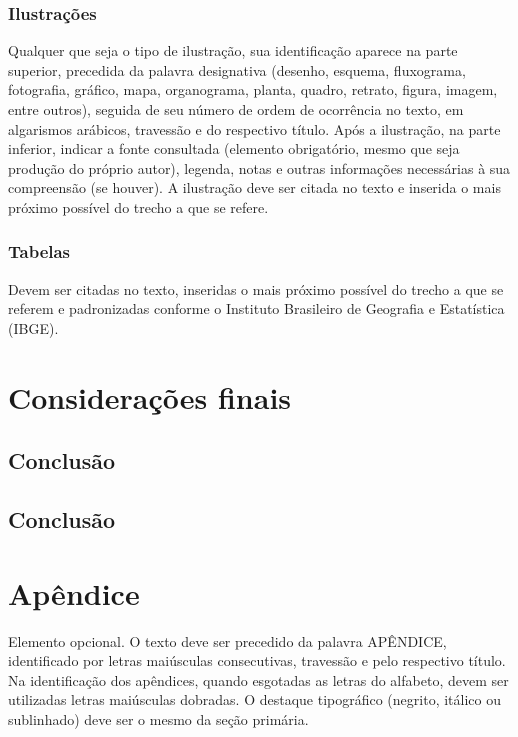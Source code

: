 \documentclass{Arquivos/TrabalhoAcademico}
\begin{document}
\subsection{Ilustrações}
Qualquer que seja o tipo de ilustração, sua identificação aparece na parte superior, precedida da
palavra designativa (desenho, esquema, fluxograma, fotografia, gráfico, mapa, organograma, planta,
quadro, retrato, figura, imagem, entre outros), seguida de seu número de ordem de ocorrência no texto,
em algarismos arábicos, travessão e do respectivo título. Após a ilustração, na parte inferior, indicar
a fonte consultada (elemento obrigatório, mesmo que seja produção do próprio autor), legenda,
notas e outras informações necessárias à sua compreensão (se houver). A ilustração deve ser citada
no texto e inserida o mais próximo possível do trecho a que se refere.

\subsection{Tabelas}
Devem ser citadas no texto, inseridas o mais próximo possível do trecho a que se referem e padronizadas
conforme o Instituto Brasileiro de Geografia e Estatística (IBGE).



\chapter{Considerações finais}
\section{Conclusão}
\lipsum[1]
\section{Conclusão}
\lipsum[1]


\postextual %


\printbibliography[heading=none]


\inicioApendices
\chapter{Apêndice}
Elemento opcional. O texto deve ser precedido da palavra APÊNDICE, identificado por letras maiúsculas
consecutivas, travessão e pelo respectivo título. Na identificação dos apêndices, quando esgotadas
as letras do alfabeto, devem ser utilizadas letras maiúsculas dobradas. O destaque tipográfico (negrito,
itálico ou sublinhado) deve ser o mesmo da seção primária.\\[1em]
\end{document}
